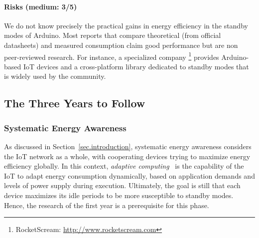 \documentclass[12pt,english]{amsart}
\begin{document}
\paragraph{\textbf{Risks (medium: 3/5)}}

We do not know precisely the practical gains in energy efficiency in the
standby modes of Arduino.
Most reports that compare theoretical (from official datasheets)
and measured consumption claim good performance but are non peer-reviewed
research.
For instance, a specialized company%
\footnote{RocketScream: \url{http://www.rocketscream.com}}
provides Arduino-based IoT devices and a cross-platform library dedicated to
standby modes that is widely used by the community.

\subsection{The Three Years to Follow}

\subsubsection{Systematic Energy Awareness}
\label{sec.method.systematic}

As discussed in Section~\ref{sec.introduction}, systematic energy awareness
considers the IoT network as a whole, with cooperating devices trying to
maximize energy efficiency globally.
%
In this context, \emph{adaptive computing}~\cite{adaptive} is the capability of
the IoT to adapt energy consumption dynamically, based on application demands
and levels of power supply during execution.
%
Ultimately, the goal is still that each device maximizes its idle
periods to be more susceptible to standby modes.
Hence, the research of the
first year is a prerequisite for this phase.
\end{document}
